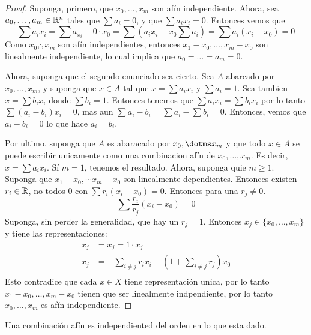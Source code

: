 \begin{proof}
    Suponga, primero, que $x_0, \dots, x_m$ son af\'in independiente. Ahora, sea
    $a_0, \dots, a_m \in \mathbb{R}^n$ tales que $\sum{a_i}=0$, y que $\sum{a_ix_i}=0$.
    Entonces vemos que
    \begin{equation*}
        \sum{a_ix_i}=\sum{a_x_i-0 \cdot x_0}=\sum{(a_ix_i-x_0\sum{a_i})}
        =\sum{a_i(x_i-x_0)}=0
    \end{equation*}
    Como $x_0, \dot, x_m$ son af\'in independientes, entonces $x_1-x_0, \dots,
    x_m-x_0$ son linealmente independiente, lo cual implica que
    $a_0=\dots=a_m=0$.

    Ahora, suponga que el segundo enunciado sea cierto. Sea  $A$ abarcado por
    $x_0, \dots, x_m$, y suponga que $x \in A$ tal que  $x=\sum{a_ix_i}$ y
    $\sum{a_i}=1$. Sea tambien $x=\sum{b_ix_i}$ donde $\sum{b_i}=1$. Entonces
    tenemos que $\sum{a_ix_i}=\sum{b_ix_i}$ por lo tanto
    $\sum{(a_i-b_i)x_i}=0$, mas aun $\sum{a_i-b_i}=\sum{a_i}-\sum{b_i}=0$.
    Entonces, vemos que $a_i-b_i=0$ lo que hace  $a_i=b_i$.

    Por ultimo, suponga que $A$ es abaracado por  $x_0, \dotms x_m$ y que todo
    $x \in A$ se puede escribir unicamente como una combinacion af\'in de  $x_0,
    \dots, x_m$. Es decir, $x=\sum{a_ix_i}$. S\'i $m=1$, tenemos el resultado.
    Ahora, suponga quie  $m \geq 1$. Suponga que  $x_1-x_0, \dotsm x_m-x_0$ son
    linealmente dependientes. Entonces existen $r_i \in \mathbb{R}$, no todos  $0$ con
    $\sum{r_i(x_i-x_0)}=0$. Entonces para una $r_j \neq 0$.
    \begin{equation*}
        \sum{\frac{r_i}{r_j}(x_i-x_0)}=0
    \end{equation*}
    Suponga, sin perder la generalidad, que hay un
    $r_j=1$. Entonces  $x_j \in \{x_0, \dots, x_m\}$ y tiene las
    representaciones:
    \begin{align*}
        x_j     &=      x_j=1 \cdot x_j     \\
        x_j     &=      -\sum_{i \neq j}{r_ix_i}+(1+\sum_{i \neq j}{r_j})x_0    \\
    \end{align*}
    Esto contradice que cada $x \in X$ tiene representaci\'on unica, por lo
    tanto  $x_1-x_0, \dots, x_m-x_0$ tienen que ser linealmente indpendiente,
    por lo tanto $x_0, \dots, x_m$ es af\'in independiente.
\end{proof}
\begin{corollary}
    Una combinaci\'on af\'in es independiented del orden en lo que esta dado.
\end{corollary}
